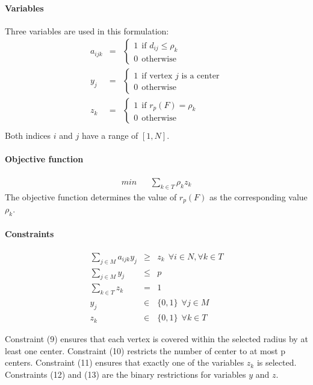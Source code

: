 \documentclass[a4paper,10pt]{article}
\begin{document}
	\paragraph{Variables} Three variables are used in this formulation:
	\begin{eqnarray*}
		a_{ijk} &=& \begin{cases}
 				1 ~~\text{if $d_{ij} \leq \rho_k$} \\
 				0 ~~\text{otherwise}
 			\end{cases} \\
		y_j &=& \begin{cases}
 				1 ~~\text{if vertex $j$ is a center} \\
 				0 ~~\text{otherwise}
 			\end{cases} \\
 		z_{k} &=& \begin{cases}
 				1 ~~\text{if $r_p(F) = \rho_k$} \\
 				0 ~~\text{otherwise}
 			\end{cases} \\
	\end{eqnarray*}
	Both indices $i$ and $j$ have a range of $[1, N]$.
	
	\paragraph{Objective function}
	\begin{eqnarray}
		min && \sum_{k \in T} \rho_{k} z_{k}	
	\end{eqnarray}
	The objective function determines the value of $r_p(F)$ as the corresponding value $\rho_k$.
	
	\paragraph{Constraints}
	\begin{eqnarray}
    	\sum_{j \in M} a_{ijk} y_{j} &\geq& z_k ~~\forall i \in N, \forall k \in T \\
		\sum_{j \in M} y_{j} &\leq& p \\
		\sum_{k \in T} z_{k} &=& 1 \\
		y_j &\in& \{ 0,1 \} ~~\forall j \in M \\
		z_{k} &\in& \{0 , 1 \} ~~\forall k \in T 
	\end{eqnarray}
	
	Constraint (9) ensures that each vertex is covered within the selected radius by at least one center.
	Constraint (10) restricts the number of center to at most p centers.
	Constraint (11) ensures that exactly one of the variables $z_k$ is selected. 
	Constraints (12) and (13) are the binary restrictions for variables $y$ and $z$. 
	
\end{document}
